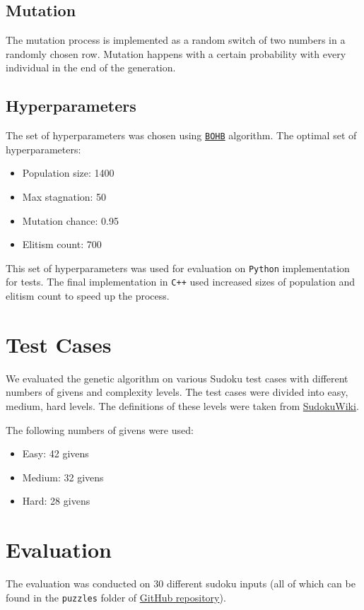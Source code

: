 \documentclass[12pt]{article}
\begin{document}
\subsection{Mutation}
The mutation process is implemented as a random
switch of two numbers in a randomly chosen row.
Mutation happens with a certain probability with every
individual in the end of the generation.

\subsection{Hyperparameters}
The set of hyperparameters was chosen using
\href{https://arxiv.org/abs/1807.01774}{\texttt{BOHB}}
algorithm. The optimal set of hyperparameters:
\begin{itemize}
	\item Population size: 1400
	\item Max stagnation: 50
	\item Mutation chance: 0.95
	\item Elitism count: 700
\end{itemize}

This set of hyperparameters was used for evaluation on
\texttt{Python} implementation for tests. The final
implementation in \texttt{C++} used increased sizes of
population and elitism count to speed up the process.

\section{Test Cases}
We evaluated the genetic algorithm on various
Sudoku test cases with different numbers of
givens and complexity levels. The test cases
were divided into easy, medium, hard levels.
The definitions of these levels were taken
from \href{https://www.sudokuwiki.org}{SudokuWiki}.

The following numbers of givens were used:
\begin{itemize}
	\item Easy: 42 givens
	\item Medium: 32 givens
	\item Hard: 28 givens
\end{itemize}

\section{Evaluation}
The evaluation was conducted on 30 different sudoku inputs
(all of which can be found in the \texttt{puzzles} folder
of \href{https://github.com/V1adych/itai-genetic-sudoku-solver}{GitHub repository}).
\end{document}
